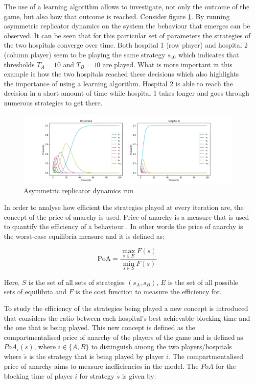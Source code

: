 The use of a learning algorithm allows to investigate, not only the outcome of 
the game, but also how that outcome is reached.
Consider figure \ref{fig:ard_by_itself}. 
By running asymmetric replicator dynamics on the system the behaviour that 
emerges can be observed.
It can be seen that for this particular set of parameters the strategies of 
the two hospitals converge over time. 
Both hospital 1 (row player) and hospital 2 (column player) seem to be playing 
the same strategy \(s_{10}\) which indicates that thresholds \(T_A = 10\) and 
\(T_B = 10\) are played.
What is more important in this example is how the two hospitals reached these
decisions which also highlights the importance of using a learning algorithm.
Hospital 2 is able to reach the decision in a short amount of time while 
hospital 1 takes longer and goes through numerous strategies to get there.

\begin{figure}[H]
    \centering
    \includegraphics[scale=0.4, trim=120 0 120 0]{imgs/asymmetric_rd/asymmetric_rd.png}
    \caption{Asymmetric replicator dynamics run}
    \label{fig:ard_by_itself}
\end{figure}

In order to analyse how efficient the strategies played at every iteration are, 
the concept of the price of anarchy is used.
Price of anarchy is a measure that is used to quantify the efficiency of a
behaviour \cite{roughgarden2005selfish}.
In other words the price of anarchy is the worst-case equilibria measure and it 
is defined as:

\begin{equation}\label{eq:general_price_of_anarchy}
    \text{PoA} = \frac{\max_{s \in E} F(s)}{\min_{s \in S} F(s)}
\end{equation}

Here, \(S\) is the set of all sets of strategies \((s_A, s_B)\), \(E\) is the 
set of all possible sets of equilibria and \(F\) is the cost function to 
measure the efficiency for. 

To study the efficiency of the strategies being played a new concept is 
introduced that considers the ratio between each hospital's best achievable 
blocking time and the one that is being played.
This new concept is defined as the compartmentalised price of anarchy of the 
players of the game and is defined as \(PoA_i(\tilde{s})\), where 
\(i \in \{A, B\}\) to distinguish among the two players/hospitals where 
\(\tilde{s}\) is the strategy that is being played by player \( i \). 
The compartmentalised price of anarchy aims to measure inefficiencies in the 
model.
The \(PoA\) for the blocking time of player \(i\) for strategy \(\tilde{s}\) 
is given by:

